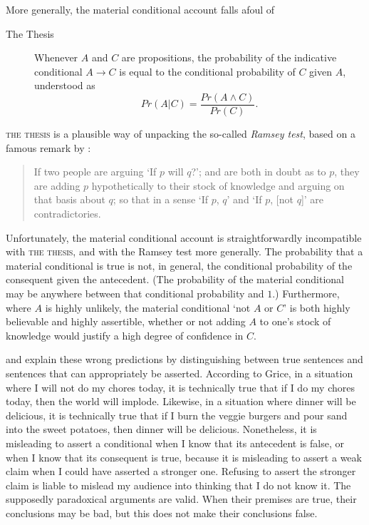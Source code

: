 More generally, the material conditional account falls afoul of
\begin{description}
\item[The Thesis]  Whenever $A$ and $C$ are propositions, the probability of the indicative conditional $A \rightarrow C$ is equal to the conditional probability of $C$ given $A$, understood as $$Pr(A|C) = \frac{Pr(A \wedge C)}{Pr(C)}.$$
\end{description}
\textsc{the thesis} is a plausible way of unpacking the so-called \emph{Ramsey test}, based on a famous remark by \citet[143n]{ramsey:test}:
\begin{quote}
If two people are arguing `If $p$ will $q$?'; and are both in doubt as to $p$, they are adding $p$ hypothetically to their stock of knowledge and arguing on that basis
about $q$; so that in a sense `If $p$, $q$' and `If $p$, [not $q$]' are contradictories.
\end{quote}

Unfortunately, the material conditional account is straightforwardly incompatible with \textsc{the thesis}, and with the Ramsey test more generally. The probability that a material conditional is true is not, in general, the conditional probability of the consequent given the antecedent.  (The probability of the material conditional may be anywhere between that conditional probability and $1$.) Furthermore, where $A$ is highly unlikely, the material conditional `not $A$ or $C$' is both highly believable and highly assertible, whether or not adding $A$ to one's stock of knowledge would justify a high degree of confidence in $C$.

\citet{grice-studies} and \citet{jackson} explain these wrong predictions by distinguishing between true sentences and sentences that can appropriately be asserted.  According to Grice, in a situation where I will not do my chores today, it is technically true that if I do my chores today, then the world will implode.  Likewise, in a situation where dinner will be delicious, it is technically true that if I burn the veggie burgers and pour sand into the sweet potatoes, then dinner will be delicious.  Nonetheless, it is misleading to assert a conditional when I know that its antecedent is false, or when I know that its consequent is true, because it is misleading to assert a weak claim when I could have asserted a stronger one.  Refusing to assert the stronger claim is liable to mislead my audience into thinking that I do not know it.  The supposedly paradoxical arguments are valid.  When their premises are true, their conclusions may be bad, but this does not make their conclusions false.


